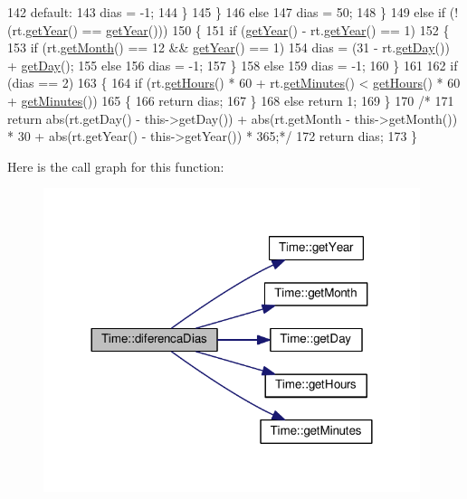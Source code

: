 \begin{DoxyCode}
142             \textcolor{keywordflow}{default}:
143                 dias = -1;
144             \}
145         \}
146         \textcolor{keywordflow}{else}
147             dias = 50;
148     \}
149     \textcolor{keywordflow}{else} \textcolor{keywordflow}{if} (!(rt.\hyperlink{classTime_ade4d01d38041bb86a2e1ded9fd3cd28e}{getYear}() == \hyperlink{classTime_ade4d01d38041bb86a2e1ded9fd3cd28e}{getYear}()))
150     \{
151         \textcolor{keywordflow}{if} (\hyperlink{classTime_ade4d01d38041bb86a2e1ded9fd3cd28e}{getYear}() - rt.\hyperlink{classTime_ade4d01d38041bb86a2e1ded9fd3cd28e}{getYear}() == 1)
152         \{
153             \textcolor{keywordflow}{if} (rt.\hyperlink{classTime_a22fd86b14d3b067cf1447fd9ca5caf6f}{getMonth}() == 12 && \hyperlink{classTime_ade4d01d38041bb86a2e1ded9fd3cd28e}{getYear}() == 1)
154                 dias = (31 - rt.\hyperlink{classTime_abdccc37217b520155a67a1d732014f1a}{getDay}()) + \hyperlink{classTime_abdccc37217b520155a67a1d732014f1a}{getDay}();
155             \textcolor{keywordflow}{else}
156                 dias = -1;
157         \}
158         \textcolor{keywordflow}{else}
159             dias = -1;
160     \}
161 
162     \textcolor{keywordflow}{if} (dias == 2)
163     \{
164         \textcolor{keywordflow}{if} (rt.\hyperlink{classTime_ac38ba7bbc9876d7d75c6fb16ba7ac453}{getHours}() * 60 + rt.\hyperlink{classTime_a800d91da444cd295a329925c45942359}{getMinutes}() < \hyperlink{classTime_ac38ba7bbc9876d7d75c6fb16ba7ac453}{getHours}() * 60 + 
      \hyperlink{classTime_a800d91da444cd295a329925c45942359}{getMinutes}())
165         \{
166             \textcolor{keywordflow}{return} dias;
167         \}
168         \textcolor{keywordflow}{else} \textcolor{keywordflow}{return} 1;
169     \}
170     \textcolor{comment}{/*}
171 \textcolor{comment}{    return abs(rt.getDay() - this->getDay()) + abs(rt.getMonth - this->getMonth()) * 30 + abs(rt.getYear()
       - this->getYear()) * 365;*/}
172     \textcolor{keywordflow}{return} dias;
173 \}
\end{DoxyCode}


Here is the call graph for this function\+:\nopagebreak
\begin{figure}[H]
\begin{center}
\leavevmode
\includegraphics[width=312pt]{classTime_a346c1dbc706dfd41e4a15b16577e4265_cgraph}
\end{center}
\end{figure}


